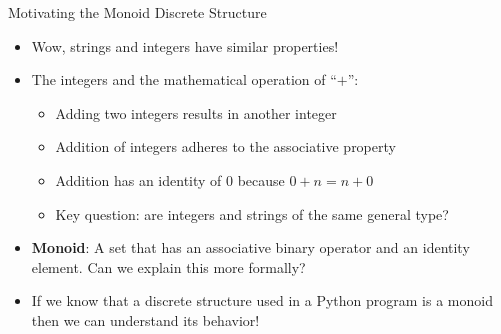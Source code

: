 \documentclass[14pt,aspectratio=169]{beamer}
\begin{document}
%
\begin{frame}{Motivating the Monoid Discrete Structure}
  \begin{itemize}
    \item Wow, strings and integers have similar properties!
      \vspace*{-.15in}
    \item The integers and the mathematical operation of ``$+$'':
      \begin{itemize}
        \item Adding two integers results in another integer
        \item Addition of integers adheres to the associative property
        \item Addition has an identity of $0$ because $0 + n = n + 0$
        \item Key question: are integers and strings of the same general type?
      \end{itemize}
      \vspace*{-.2in}
    \item {\bf Monoid}: A set that has an associative binary operator and an
      identity element. Can we explain this more formally?
      \vspace*{-.2in}
    \item If we know that a discrete structure used in a Python program is a
      monoid then we can understand its behavior!
  \end{itemize}
\end{frame}
\end{document}
